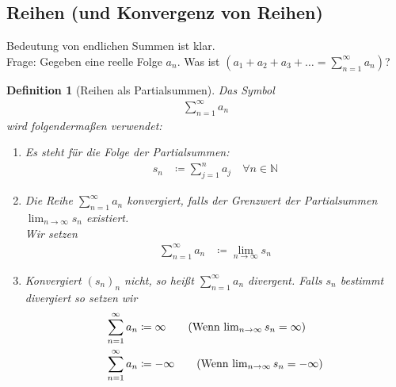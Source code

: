 \documentclass[11pt, twoside, a4paper]{article}
\theoremstyle{plain}
\newtheorem{definition}[blockelement]{Definition}
\newcommand{\pair}[1]{\left(#1\right)}
\newcommand{\definedas}[0]{\coloneqq}
\newcommand{\fromto}{\rightarrow{}}
\newcommand{\naturalnumbers}{\mathbb{N}}
\begin{document}
    \newpage

    \subsection{Reihen (und Konvergenz von Reihen)}

    Bedeutung von endlichen Summen ist klar.\\
    Frage: Gegeben eine reelle Folge $a_n$. Was ist $\pair{a_1 + a_2 + a_3 + \dots = \sum_{n=1}^{\infty} a_n}$?

    \begin{definition}[Reihen als Partialsummen] %
        Das Symbol
        \begin{align*}
            \sum_{n=1}^{\infty} a_n\tag{Sei $a_n$ eine reelle Folge}
        \end{align*}
        wird folgendermaßen verwendet:

        \begin{enumerate}[label=\alph*)]
            \item Es steht für die Folge der Partialsummen:
            \begin{align*}
                s_n&\definedas \sum_{j=1}^{n} a_j\quad\forall n\in\naturalnumbers
            \end{align*}
            \item Die Reihe $\sum_{n=1}^{\infty} a_n$ konvergiert, falls der Grenzwert der Partialsummen $\lim_{n\fromto\infty} s_n$ existiert.\\
            Wir setzen
            \begin{align*}
                \sum_{n=1}^{\infty} a_n &\definedas \lim_{n\fromto\infty} s_n
            \end{align*}
            \item Konvergiert $(s_n)_n$ nicht, so heißt $\sum_{n=1}^{\infty} a_n$ divergent. Falls $s_n$ bestimmt divergiert so setzen wir
            \begin{align*}
                \sum_{n=1}^{\infty} a_n &\definedas \infty \tag{Wenn $\lim_{n\fromto\infty} s_n = \infty$}\\
                \sum_{n=1}^{\infty} a_n &\definedas -\infty \tag{Wenn $\lim_{n\fromto\infty} s_n = -\infty$}
            \end{align*}
        \end{enumerate}
    \end{definition}
\end{document}
